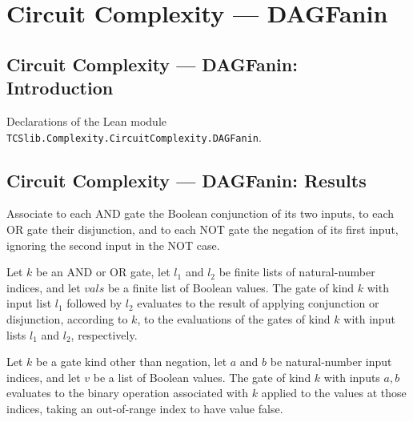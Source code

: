 \section{Circuit Complexity --- DAGFanin}
\subsection*{Circuit Complexity --- DAGFanin: Introduction}

Declarations of the Lean module \texttt{TCSlib.Complexity.CircuitComplexity.DAGFanin}.

\subsection*{Circuit Complexity --- DAGFanin: Results}

\begin{definition}
\label{BoolCircuit.GateKind.op}
\leanok
{}
Associate to each AND gate the Boolean conjunction of its two inputs, to each OR gate
their disjunction, and to each NOT gate the negation of its first input, ignoring the
second input in the NOT case.
\end{definition}

\begin{theorem}
\label{BoolCircuit.DAGGate.eval_append}
\leanok
{}
Let $k$ be an AND or OR gate, let $l_1$ and $l_2$ be finite lists of natural-number
indices, and let $vals$ be a finite list of Boolean values. The gate of kind $k$ with
input list $l_1$ followed by $l_2$ evaluates to the result of applying conjunction or
disjunction, according to $k$, to the evaluations of the gates of kind $k$ with input
lists $l_1$ and $l_2$, respectively.
\end{theorem}

\begin{theorem}
\label{BoolCircuit.DAGGate.eval_pair}
\leanok
{}
Let $k$ be a gate kind other than negation, let $a$ and $b$ be natural-number input
indices, and let $v$ be a list of Boolean values. The gate of kind $k$ with inputs $a,b$
evaluates to the binary operation associated with $k$ applied to the values at those
indices, taking an out-of-range index to have value false.
\end{theorem}

